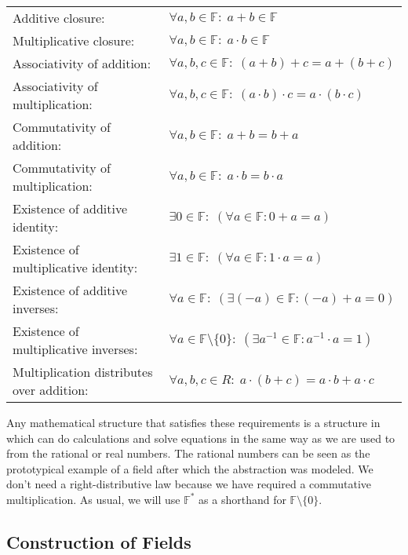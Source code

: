 \medskip
\begin{tabular}{l l}
Additive closure: 
& $\forall a,b \in \mathbb{F}: \; a + b \in \mathbb{F}$  \\	
Multiplicative closure: 
& $\forall a,b \in \mathbb{F}: \; a \cdot b \in \mathbb{F}$  \\	
Associativity of addition: 
& $\forall a,b,c \in \mathbb{F}: \;  (a + b) + c = a + (b + c)$   \\
Associativity of multiplication: 
& $\forall a,b,c \in \mathbb{F}: \;  (a \cdot b) \cdot c = a \cdot (b \cdot c)$   \\
Commutativity of addition: 
& $\forall a,b \in \mathbb{F}: \;  a + b = b + a$   \\
Commutativity of multiplication: 
& $\forall a,b \in \mathbb{F}: \;  a \cdot b = b \cdot a$   \\
Existence of additive identity: 
& $\exists 0 \in \mathbb{F}: \; (\forall a \in \mathbb{F}: 0 + a = a)$ \\
Existence of multiplicative identity: 
& $\exists 1 \in \mathbb{F}: \; (\forall a \in \mathbb{F}: 1 \cdot a = a)$ \\
Existence of additive inverses: 
& $\forall a \in \mathbb{F}: \; (\exists (-a) \in \mathbb{F}: (-a) + a = 0 )$ \\
Existence of multiplicative inverses: 
& $\forall a \in \mathbb{F} \setminus \{0\}: \; (\exists a^{-1} \in \mathbb{F}: a^{-1} \cdot a = 1 )$ \\
Multiplication distributes over addition: 
& $\forall a,b,c \in R: \;  a \cdot (b + c) = a \cdot b + a \cdot c$
\end{tabular}


Any mathematical structure that satisfies these requirements is a structure in which can do calculations and solve equations in the same way as we are used to from the rational or real numbers. The rational numbers can be seen as the prototypical example of a field after which the abstraction was modeled. We don't need a right-distributive law because we have required a commutative multiplication. As usual, we will use $\mathbb{F}^*$ as a shorthand for $\mathbb{F} \setminus \{0\}$.

\subsection{Construction of Fields}


